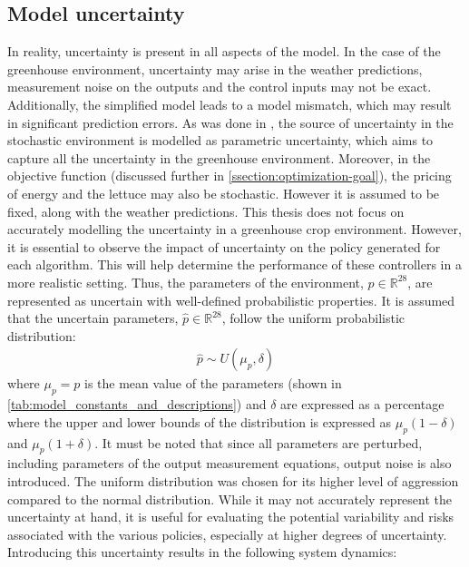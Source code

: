 \subsection{Model uncertainty}
In reality, uncertainty is present in all aspects of the model. In the case of the greenhouse environment, uncertainty may arise in the weather predictions, measurement noise on the outputs and the control inputs may not be exact. Additionally, the simplified model leads to a model mismatch, which may result in significant prediction errors.  As was done in \cite{boersmaRobustSamplebasedModel2022, lubbersAutonomousGreenhouseClimate2023}, the source of uncertainty in the stochastic environment is modelled as parametric uncertainty, which aims to capture all the uncertainty in the greenhouse environment. Moreover, in the objective function (discussed further in \autoref{ssection:optimization-goal}), the pricing of energy and the lettuce may also be stochastic. However it is assumed to be fixed, along with the weather predictions.
This thesis does not focus on accurately modelling the uncertainty in a greenhouse crop environment. However, it is essential to observe the impact of uncertainty on the policy generated for each algorithm. This will help determine the performance of these controllers in a more realistic setting. Thus, the parameters of the environment, $p \in \mathbb{R}^{28}$, are represented as uncertain with well-defined probabilistic properties. It is assumed that the uncertain parameters, $\hat{p} \in \mathbb{R}^{28}$, follow the uniform probabilistic distribution:
\begin{equation}
	\label{eq:uncertainty_model}
	\begin{aligned}
		\hat{p} \sim U(\mu_p, \delta)  
	\end{aligned}
\end{equation}
where $\mu_p = p$ is the mean value of the parameters  (shown in \autoref{tab:model_constants_and_descriptions}) and $\delta$ are expressed as a percentage where the upper and lower bounds of the distribution is expressed as $\mu_p(1-\delta)$ and $\mu_p(1+\delta)$. It must be noted that since all parameters are perturbed, including parameters of the output measurement equations, output noise is also introduced. The uniform distribution was chosen for its higher level of aggression compared to the normal distribution. While it may not accurately represent the uncertainty at hand, it is  useful for evaluating the potential variability and risks associated with the various policies, especially at higher degrees of uncertainty. Introducing this uncertainty results in the following system dynamics:

